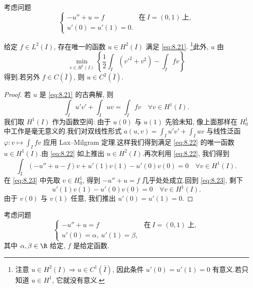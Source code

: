 \begin{example}[齐次 Neumann 条件]
\label{ex:8.3}
考虑问题
\begin{equation}
\begin{cases}
-u''+u=f & \text{在}\ I=(0,1)\ \text{上},\\
u'(0)=u'(1)=0.
\end{cases}
\label{eq:8.21}
\end{equation}
\end{example}

\begin{keyproposition}
\label{prop:8.17}
给定 $f\in L^2(I)$, 存在唯一的函数 $u\in H^2(I)$ 满足 \eqref{eq:8.21}.
\footnote{注意 $u\in H^2(I)\Rightarrow u\in C^1(\bar I)$, 因此条件
$u'(0)=u'(1)=0$ 有意义.若只知道 $u\in H^1$, 它就没有意义.}此外, $u$ 由
\begin{equation*}
\min_{v\in H^1(I)}\left\{\frac12\int_I(v'^2+v^2)-\int_I fv\right\}
\end{equation*}
得到.若另外 $f\in C(\bar I)$, 则 $u\in C^2(\bar I)$.
\end{keyproposition}

\begin{proof}
若 $u$ 是 \eqref{eq:8.21} 的古典解, 则
\begin{equation}
\int_I u'v'+\int_I uv=\int_I fv\quad\forall v\in H^1(I).
\label{eq:8.22}
\end{equation}
我们取 $H^1(I)$ 作为函数空间: 由于 $u(0)$ 与 $u(1)$ 先验未知, 像上面那样在
$H_0^1$ 中工作是毫无意义的.我们对双线性形式
$a(u,v)=\int_I u'v'+\int_I uv$ 与线性泛函 $\varphi:v\mapsto\int_I fv$ 应用
Lax--Milgram 定理.这样我们得到满足 \eqref{eq:8.22} 的唯一函数
$u\in H^1(I)$.由 \eqref{eq:8.22} 如上推出 $u\in H^2(I)$.再次利用
\eqref{eq:8.22}, 我们得到
\begin{equation}
\int_I(-u''+u-f)v+u'(1)v(1)-u'(0)v(0)=0\quad\forall v\in H^1(I).
\label{eq:8.23}
\end{equation}
在 \eqref{eq:8.23} 中先取 $v\in H_0^1$, 得到 $-u''+u=f$ 几乎处处成立.回到
\eqref{eq:8.23}, 剩下
\begin{equation*}
u'(1)v(1)-u'(0)v(0)=0\quad\forall v\in H^1(I).
\end{equation*}
由于 $v(0)$ 与 $v(1)$ 任意, 我们推出 $u'(0)=u'(1)=0$.
\end{proof}

\begin{example}
\label{ex:8.4}
考虑问题
\begin{equation}
\begin{cases}
-u''+u=f & \text{在}\ I=(0,1)\ \text{上},\\
u'(0)=\alpha,\ u'(1)=\beta,
\end{cases}
\label{eq:8.24}
\end{equation}
其中 $\alpha,\beta\in\R$ 给定, $f$ 是给定函数.
\end{example}

